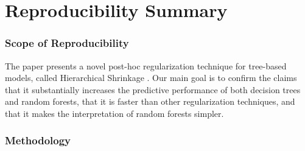 \section*{\centering Reproducibility Summary}


\subsubsection*{Scope of Reproducibility}


The paper presents a novel post-hoc regularization technique for tree-based models, called Hierarchical Shrinkage \cite{agarwal2022}. Our main goal is to confirm the claims that it substantially increases the predictive performance of both decision trees and random forests, that it is faster than other regularization techniques, and that it makes the interpretation of random forests simpler.

\subsubsection*{Methodology}


